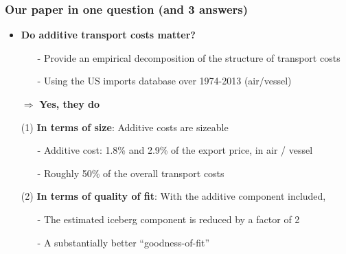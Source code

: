 \documentclass[10 pt,Helvetica, french]{beamer}
\begin{document}
\begin{frame}
\frametitle{Our paper in one question (and 3 answers)}

\begin{itemize}
\item  \textbf{Do additive transport costs matter?} \vspace{0.1cm}
\begin{itemize}
\item[-] Provide an empirical decomposition of the structure of transport costs \vspace{0.1cm}
\item[-] Using the US imports database over 1974-2013 (air/vessel)\vspace{0.2cm}
\end{itemize}
\item[$\Rightarrow$] \textbf{Yes, they do} \vspace{0.1cm}

\item[(1)] \textbf{In terms of size}: Additive costs are sizeable \vspace{0.1cm}
\begin{itemize}
\item[-] Additive cost: 1.8\% and 2.9\% of the export price, in air / vessel \vspace{0.1cm}
\item[-] Roughly 50\% of the overall transport costs \vspace{0.1cm}

\end{itemize}
\item[(2)] \textbf{In terms of quality of fit}: With the additive component included, \vspace{0.1cm}
\begin{itemize}
\item[-] The estimated iceberg component is reduced by a factor of 2 \vspace{0.1cm}
\item[-] A substantially better ``goodness-of-fit'' %
\end{itemize}
\end{itemize}
\end{frame}
\end{document}
